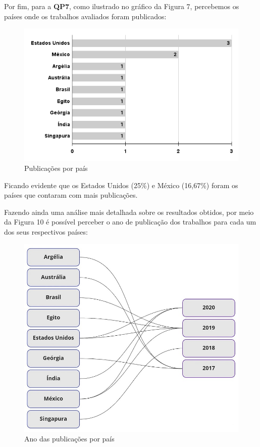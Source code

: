 \documentclass[conference]{IEEEtran}
\begin{document}
Por fim, para a \textbf{QP7}, como ilustrado no gráfico da Figura 7, percebemos os países onde os trabalhos avaliados foram publicados: 

\begin{figure}[h]
    \centering
    \includegraphics[scale=0.39]{images/quantitativo-publicacoes-por-pais.png}
    \caption{Publicações por país}
    \label{fig:quantitativo-publicacoes-por-pais}
\end{figure}

Ficando evidente que os Estados Unidos \cite{ArtigoN2, ArtigoN7, ArtigoN10} (25\%) e México \cite{ArtigoN1, ArtigoN6} (16,67\%) foram os países que contaram com mais publicações.

Fazendo ainda uma análise mais detalhada sobre os resultados obtidos, por meio da Figura 10 é possível perceber o ano de publicação dos trabalhos para cada um dos seus respectivos países:

\begin{figure}[h]
    \centering
    \includegraphics[scale=0.4]{images/ano-publicacao-paises.jpg}
    \caption{Ano das publicações por país}
    \label{fig:ano-publicacao-paises}
\end{figure}
\end{document}
